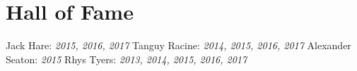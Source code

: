 \section{Hall of Fame} 

Jack Hare: \textsl{2015, 2016, 2017 }
\newline
Tanguy Racine: \textsl{2014, 2015, 2016, 2017 }
\newline
Alexander Seaton: \textsl{2015 }
\newline
Rhys Tyers: \textsl{2013, 2014, 2015, 2016, 2017 }
\newline
